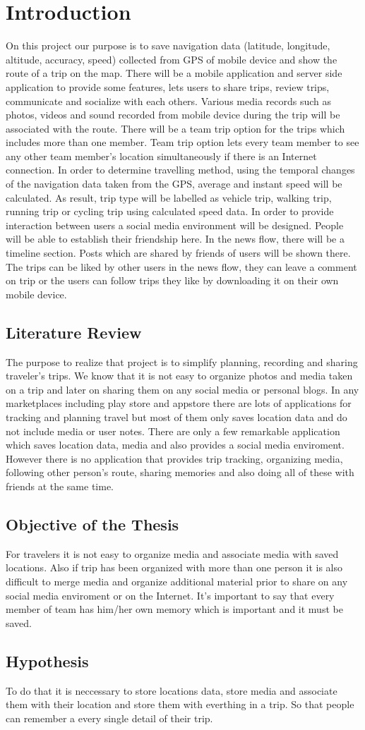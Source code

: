 \chapter{Introduction}
On this project our purpose is to save navigation data (latitude, longitude, altitude, accuracy, speed) collected from GPS of mobile device and show the route of a trip on the map. There will be a mobile application and server side application to provide some features, lets users to share trips, review trips, communicate and socialize with each others. Various media records such as photos, videos and sound recorded from mobile device during the trip will be associated with the route. There will be a team trip option for the trips which includes more than one member. Team trip option lets every team member to see any other team member's location simultaneously if there is an Internet connection. In order to determine travelling method, using the temporal changes of the navigation data taken from the GPS, average and instant speed will be calculated. As result, trip type will be labelled as vehicle trip, walking trip, running trip or cycling trip using calculated speed data. In order to provide interaction between users a social media environment will be designed. People will be able to establish their friendship here. In the news flow, there will be a timeline section. Posts which are shared by friends of users will be shown there. The trips can be liked by other users in the news flow, they can leave a comment on trip or the users can follow trips they like by downloading it on their own mobile device.
\section{Literature Review}
The purpose to realize that project is to simplify planning, recording and sharing traveler's trips. We know that it is not easy to organize photos and media taken on a trip and later on sharing them on any social media or personal blogs. In any marketplaces including play store and appstore there are lots of applications for tracking and planning travel but most of them only saves location data and do not include media or user notes. There are only a few remarkable application which saves location data, media and also provides a social media enviroment. However there is no application that provides trip tracking, organizing media, following other person's route, sharing memories and also doing all of these with friends at the same time. 

\section{Objective of the Thesis}
For travelers it is not easy to organize media and associate media with saved locations. Also if trip has been organized with more than one person it is also difficult to merge media and organize additional material prior to share on any social media enviroment or on the Internet. It's important to say that every member of team has him/her own memory which is important and it must be saved.

\section{Hypothesis}
To do that it is neccessary to store locations data, store media and associate them with their location and store them with everthing in a trip. So that people can remember a every single detail of their trip.